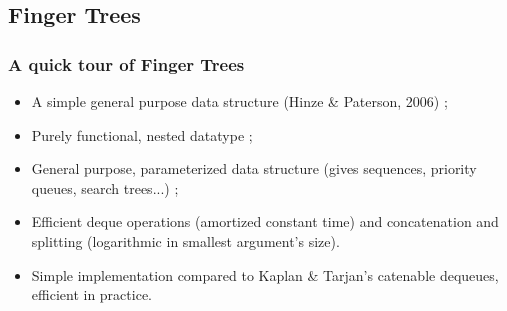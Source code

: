 \subsection{Finger Trees}

\begin{frame}
  \frametitle{A quick tour of Finger Trees}
  
  \begin{itemize}
  \item A simple general purpose data structure (Hinze \& Paterson, 2006) ;
  \item Purely functional, nested datatype ;
  \item General purpose, parameterized data structure (gives sequences,
    priority queues, search trees...) ;
  \item Efficient deque operations (amortized constant time) and
    concatenation and splitting (logarithmic in smallest argument's
    size).
  \item Simple implementation compared to Kaplan \& Tarjan's
    catenable dequeues, efficient in practice.
  \end{itemize}
  
\end{frame}

